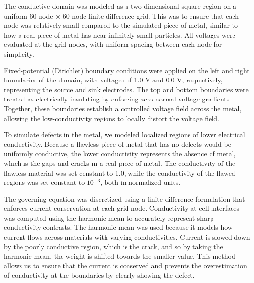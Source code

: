 \documentclass[reprint,amsmath,amssymb,aps]{revtex4-2}
\begin{document}
The conductive domain was modeled as a two-dimensional square region on a uniform 60-node $\times$ 60-node finite-difference grid. This was to ensure that each node was relatively small compared to the simulated piece of metal, similar to how a real piece of metal has near-infinitely small particles. All voltages were evaluated at the grid nodes, with uniform spacing between each node for simplicity.

Fixed-potential (Dirichlet) boundary conditions were applied on the left and right boundaries of the domain, with voltages of 1.0 V and 0.0 V, respectively, representing the source and sink electrodes. The top and bottom boundaries were treated as electrically insulating by enforcing zero normal voltage gradients. Together, these boundaries establish a controlled voltage field across the metal, allowing the low-conductivity regions to locally distort the voltage field.

To simulate defects in the metal, we modeled localized regions of lower electrical conductivity. Because a flawless piece of metal that has no defects would be uniformly conductive, the lower conductivity represents the absence of metal, which is the gaps and cracks in a real piece of metal. The conductivity of the flawless material was set constant to 1.0, while the conductivity of the flawed regions was set constant to $10^{-3}$, both in normalized units. 

The governing equation was discretized using a finite-difference formulation that enforces current conservation at each grid node. Conductivity at cell interfaces was computed using the harmonic mean to accurately represent sharp conductivity contrasts. The harmonic mean was used because it models how current flows across materials with varying conductivities. Current is slowed down by the poorly conductive region, which is the crack, and so by taking the harmonic mean, the weight is shifted towards the smaller value. This method allows us to ensure that the current is conserved and prevents the overestimation of conductivity at the boundaries by clearly showing the defect. 
\end{document}
